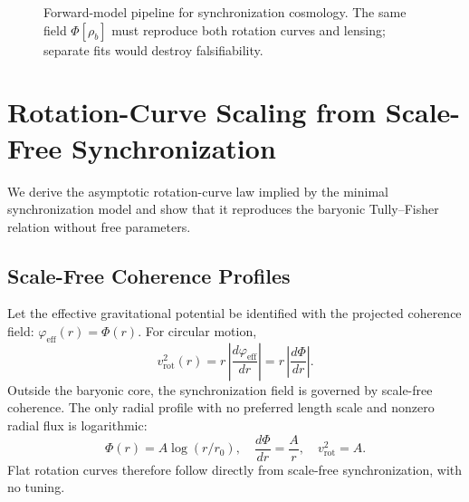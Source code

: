 \documentclass[11pt, a4paper, twocolumn]{article}
\begin{document}
\begin{figure}[ht]
\centering
{}
\caption{Forward-model pipeline for synchronization cosmology. The same field $\Phi[\rho_b]$ must reproduce both rotation curves and lensing; separate fits would destroy falsifiability.}
\end{figure}

\section{Rotation-Curve Scaling from Scale-Free Synchronization}

We derive the asymptotic rotation-curve law implied by the minimal
synchronization model and show that it reproduces the baryonic Tully--Fisher
relation without free parameters.

\subsection{Scale-Free Coherence Profiles}

Let the effective gravitational potential be identified with the projected
coherence field: $\varphi_{\mathrm{eff}}(r) = \Phi(r)$. For circular motion,
\[
    v_{\mathrm{rot}}^2(r)
    =
    r\,\left|\frac{d\varphi_{\mathrm{eff}}}{dr}\right|
    =
    r\,\left|\frac{d\Phi}{dr}\right|.
\]
Outside the baryonic core, the synchronization field is governed by scale-free
coherence. The only radial profile with no preferred length scale and nonzero
radial flux is logarithmic:
\[
    \Phi(r) = A\log(r/r_0),\quad
    \frac{d\Phi}{dr} = \frac{A}{r},\quad
    v_{\mathrm{rot}}^2 = A.
\]
Flat rotation curves therefore follow directly from scale-free synchronization,
with no tuning.
\end{document}
